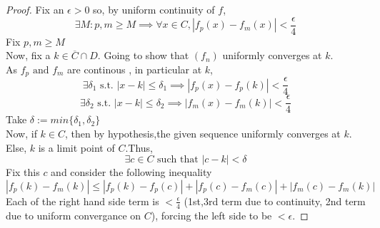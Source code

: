 \documentclass[20pt,a4paper]{extarticle} %
\begin{document}
\begin{proof}
	Fix an $\epsilon > 0$ so, by uniform continuity of $f$,
	\[ \exists M: p,m \geq M \implies \forall x \in C, |f_p(x) - f_m(x)| < \frac{\epsilon}{4} \]
	Fix $p,m \geq M$ \\
	Now, fix a  $k \in \overline{C} \cap D$. Going to show that $(f_n)$ uniformly converges at $k$.\\
	As $f_p \text{ and } f_m$ are continous , in particular at $k$,
	\[ \exists \delta_1 \text{ s.t. } |x-k|\leq \delta_1 \implies |f_p(x)-f_p(k)|<\frac{\epsilon}{4}\]
	\[ \exists \delta_2 \text{ s.t. } |x-k|\leq \delta_2 \implies |f_m(x)-f_m(k)|<\frac{\epsilon}{4}\]
	Take $\delta:=min\{\delta_1,\delta_2\}$ \\
		Now, if $k \in C$, then by hypothesis,the given sequence uniformly converges at $k$.
		Else, $k$ is a limit point of $C$.Thus,
		\[ \exists c \in C \text{ such that } |c-k|< \delta \]
		Fix this $c$ and consider the following inequality
	\[|f_p(k)-f_m(k)| \leq |f_p(k)-f_p(c)|+ |f_p(c)-f_m(c)|+ |f_m(c)-f_m(k)|\]
	Each of the right hand side term is $< \frac{\epsilon}{4} $
	(1st,3rd term due to continuity, 2nd term due to uniform convergance on $C$), forcing the left side to be $<\epsilon$.
\end{proof}

\pagebreak
\end{document}
